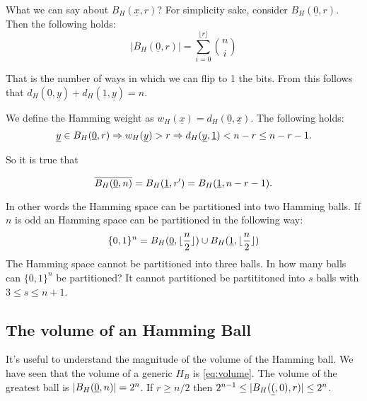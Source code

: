 What we can say about $B_H(\underline{x}, r)$? For simplicity sake, consider $B_H(\underline{0}, r)$. Then the following holds:
\begin{equation}\label{eq:volume}
	|B_H(\underline{0}, r)| = \sum_{i = 0}^{\lfloor r \rfloor} \binom{n}{i}
\end{equation}

That is the number of ways in which we can flip to 1 the bits. From this follows that $d_H(\underline{0}, \underline{y}) + d_H(\underline{1}, \underline{y}) = n$.

We define the Hamming weight as $w_H(\underline{x}) = d_H(\underline{0}, \underline{x})$. The following holds:
$$\underline{y} \in B_H(\underline{0}, r) \Rightarrow w_H(\underline{y}) > r \Rightarrow d_H(\underline{y}, \underline{1}) < n - r \leq n -r - 1.$$

So it is true that

$$\overline{B_H(\underline{0}, n)} = B_H(\underline{1}, r') = B_H(\underline{1}, n - r - 1).$$

In other words the Hamming space can be partitioned into two Hamming balls. If $n$ is odd an Hamming space can be partitioned in the following way: $$\{0, 1\}^n = B_H(\underline{0}, \lfloor \dfrac{n}{2}\rfloor ) \cup B_H(\underline{1}, \lfloor \dfrac{n}{2}\rfloor)$$
The Hamming space cannot be partitioned into three balls. In how many balls can $\{0, 1\}^n$ be partitioned? It cannot partitioned be partititoned into $s$ balls with $3 \leq s \leq n + 1$.

\subsection{The volume of an Hamming Ball}
It's useful to understand the magnitude of the volume of the Hamming ball. We have seen that the volume of a generic $H_B$ is \ref{eq:volume}. The volume of the greatest ball is $|B_H(\underline{0}, n)| = 2^n$. If $r \geq n/2$ then $2^{n-1} \leq |B_H(\underline{(}, 0), r)| \leq 2^n$.
